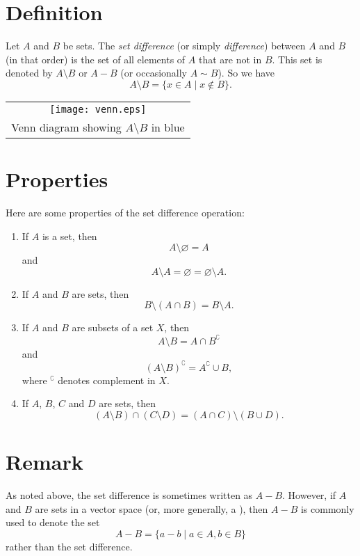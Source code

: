 \documentclass[12pt]{article}
\def\emptyset{\varnothing}
\begin{document}

\section*{Definition}
Let $A$ and $B$ be sets.
The \emph{set difference} (or simply \emph{difference})
between $A$ and $B$ (in that order)
is the set of all elements of $A$ that are not in $B$.
This set is denoted by $A\setminus B$ or $A-B$
(or occasionally $A\sim B$).   %
So we have
\[
  A\setminus B = \{ x\in A \mid x \notin B\}.
\]

\begin{center}
\begin{tabular}{c}
\texttt{[image: venn.eps]} \\
{\rm Venn diagram showing $A\setminus B$ in blue}
\end{tabular}
\end{center}

\section*{Properties}

Here are some properties of the set difference operation:

\begin{enumerate}

\item If $A$ is a set, then
\[
  A\setminus\emptyset = A
\]
and
\[
  A\setminus A = \emptyset = \emptyset\setminus A.
\]

\item If $A$ and $B$ are sets, then
\[
  B\setminus(A\cap B) = B\setminus A.
\]

\item If $A$ and $B$ are subsets of a set $X$, then
\[
  A\setminus B = A\cap B^\complement
\]
and
\[
  (A\setminus B)^\complement = A^\complement \cup B,
\]
where $^\complement$ denotes complement in $X$.

\item If $A$, $B$, $C$ and $D$ are sets, then 
\[
  (A\setminus B)\cap (C\setminus D) = (A\cap C)\setminus (B\cup D).
\]

\end{enumerate}

\section*{Remark}
As noted above, the set difference is sometimes written as $A-B$. 
However, if $A$ and $B$ are sets in a vector space
(or, more generally, a ),
then $A-B$ is commonly used to denote the set
\[
  A-B = \{ a-b \mid a\in A, b\in B\}
\]
rather than the set difference.
\end{document}
